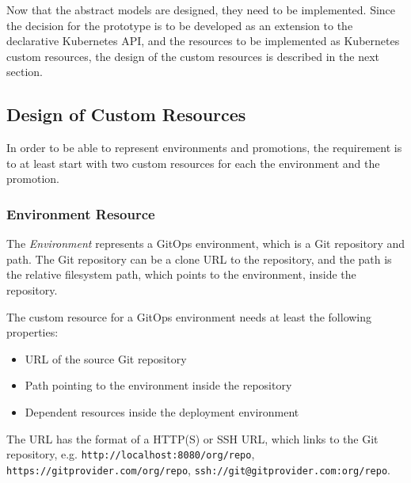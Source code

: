 Now that the abstract models are designed,
they need to be implemented.
Since the decision for the prototype is to be developed
as an extension to the declarative Kubernetes API,
and the resources to be implemented as Kubernetes custom resources,
the design of the custom resources is described in the next section.






\subsection{Design of Custom Resources}
\label{prototype:design:design-custom-resources}

In order to be able to represent environments and promotions,
the requirement is to at least start with two custom resources for each 
the environment and the promotion.

\subsubsection*{Environment Resource}

The \textit{Environment} represents a GitOps environment,
which is a Git repository and path.
The Git repository can be a clone URL to the repository,
and the path is the relative filesystem path, which points to the 
environment, inside the repository.


The custom resource for a GitOps environment needs at least the following properties:

\begin{itemize}
	\item URL of the source Git repository
	\item Path pointing to the environment inside the repository
	\item Dependent resources inside the deployment environment
\end{itemize}

The URL has the format of a HTTP(S) or SSH URL,
which links to the Git repository, e.g.
\lstinline|http://localhost:8080/org/repo|,
\lstinline|https://gitprovider.com/org/repo|,
\lstinline|ssh://git@gitprovider.com:org/repo|.

